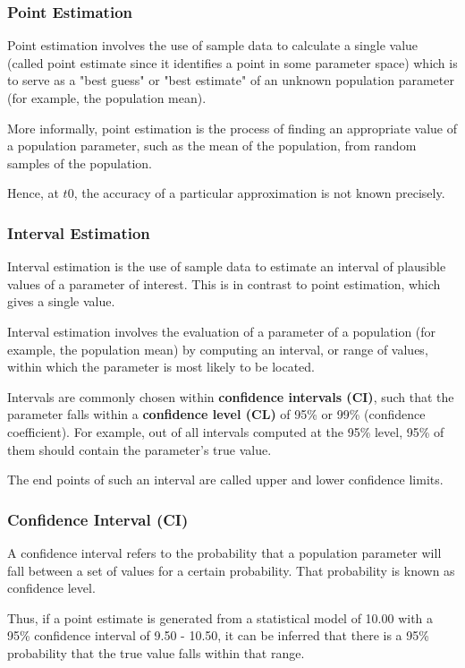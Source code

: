 \documentclass{article}
\begin{document}
\subsubsection{Point Estimation}
Point estimation involves the use of sample data to calculate a single value (called point estimate since it identifies a point in some parameter space) which is to serve as a "best guess" or "best estimate" of an unknown population parameter (for example, the population mean). 

More informally, point estimation is the process of finding an appropriate value of a population parameter, such as the mean of the population, from random samples of the population.


Hence, at $t0$, the accuracy of a particular approximation is not known precisely. 

\subsubsection{Interval Estimation}
Interval estimation is the use of sample data to estimate an interval of plausible values of a parameter of interest. This is in contrast to point estimation, which gives a single value.

Interval estimation involves the evaluation of a parameter of a population (for example, the population mean) by computing an interval, or range of values, within which the parameter is most likely to be located. 

Intervals are commonly chosen within \textbf{confidence intervals (CI)}, such that the parameter falls within a \textbf{confidence level (CL)} of 95\% or 99\% (confidence coefficient). For example, out of all intervals computed at the 95\% level, 95\% of them should contain the parameter's true value.

The end points of such an interval are called upper and lower confidence limits.

\subsubsection{Confidence Interval (CI)}
A confidence interval refers to the probability that a population parameter will fall between a set of values for a certain probability. That probability is known as confidence level.

Thus, if a point estimate is generated from a statistical model of 10.00 with a 95\% confidence interval of 9.50 - 10.50, it can be inferred that there is a 95\% probability that the true value falls within that range.
\end{document}

